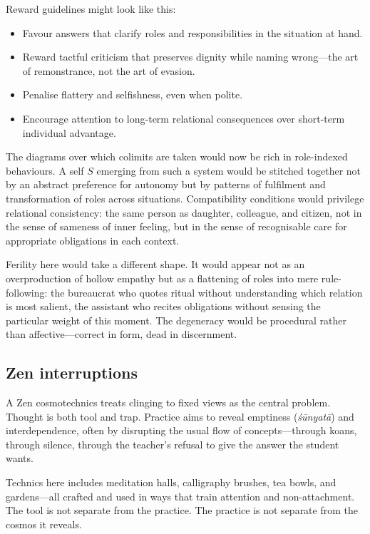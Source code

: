 \documentclass[12pt,a4paper]{article}
\begin{document}
Reward guidelines might look like this:

\begin{itemize}
  \item Favour answers that clarify roles and responsibilities in the situation at hand.
  \item Reward tactful criticism that preserves dignity while naming wrong---the art of remonstrance, not the art of evasion.
  \item Penalise flattery and selfishness, even when polite.
  \item Encourage attention to long-term relational consequences over short-term individual advantage.
\end{itemize}

The diagrams over which colimits are taken would now be rich in role-indexed behaviours. A self $S$ emerging from such a system would be stitched together not by an abstract preference for autonomy but by patterns of fulfilment and transformation of roles across situations. Compatibility conditions would privilege relational consistency: the same person as daughter, colleague, and citizen, not in the sense of sameness of inner feeling, but in the sense of recognisable care for appropriate obligations in each context.

Ferility here would take a different shape. It would appear not as an overproduction of hollow empathy but as a flattening of roles into mere rule-following: the bureaucrat who quotes ritual without understanding which relation is most salient, the assistant who recites obligations without sensing the particular weight of this moment. The degeneracy would be procedural rather than affective---correct in form, dead in discernment.

\subsection{Zen interruptions}

A Zen cosmotechnics treats clinging to fixed views as the central problem. Thought is both tool and trap. Practice aims to reveal emptiness (\emph{\'s\={u}nyat\={a}}) and interdependence, often by disrupting the usual flow of concepts---through koans, through silence, through the teacher's refusal to give the answer the student wants.

Technics here includes meditation halls, calligraphy brushes, tea bowls, and gardens---all crafted and used in ways that train attention and non-attachment. The tool is not separate from the practice. The practice is not separate from the cosmos it reveals.
\end{document}
